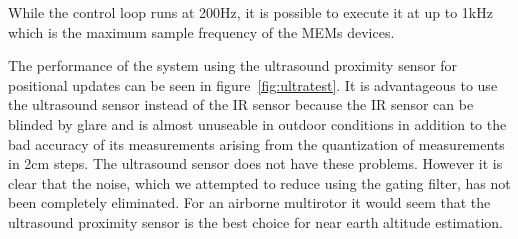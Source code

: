 While the control loop runs at 200Hz, it is possible to execute it at up to 1kHz which is the maximum sample frequency of the 
MEMs devices.

The performance of the system using the ultrasound proximity sensor for positional updates can be seen in figure~\ref{fig:ultratest}.
It is advantageous to use the ultrasound sensor instead of the IR sensor because the IR sensor can be blinded by glare and is almost
unuseable in outdoor conditions in addition to the bad accuracy of its measurements arising from the quantization of measurements in
2cm steps. The ultrasound sensor does not have these problems. However it is clear that the noise, which we attempted to reduce using the
gating filter, has not been completely eliminated. For an airborne multirotor it would seem that the ultrasound proximity 
sensor is the best choice for near earth altitude estimation.
	

